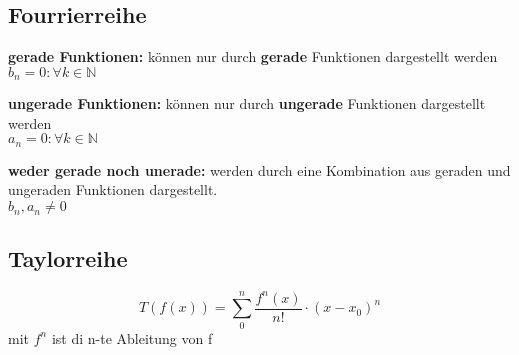 
\subsection{Fourrierreihe}
\textbf{gerade Funktionen:} können nur durch \textbf{gerade} Funktionen dargestellt werden\\
$b_n=0:\forall k \in \mathbb{N}$  

\textbf{ungerade Funktionen:} können nur durch \textbf{ungerade} Funktionen dargestellt werden\\
$a_n=0:\forall k \in \mathbb{N}$  

\textbf{weder gerade noch unerade:} werden durch eine Kombination aus geraden und ungeraden Funktionen dargestellt.\\
$b_n, a_n\neq0$ 

\subsection{Taylorreihe}

\[T(f(x))=\sum\limits_{0}^{n} \frac{f^n(x)}{n!}\cdot {(x-x_0)}^n\]
mit $f^n$ ist di n-te Ableitung von f